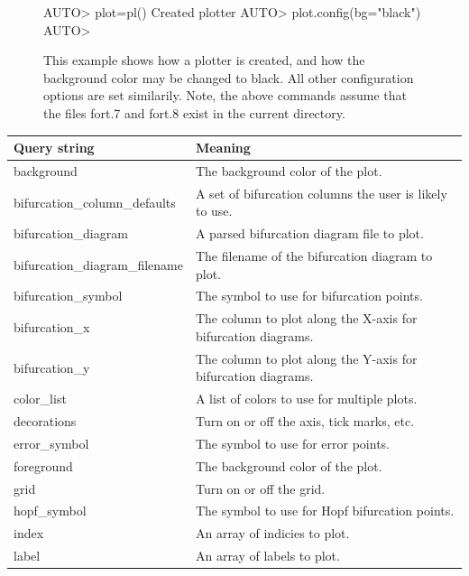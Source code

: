 \documentclass[12pt]{report}
\begin{document}
 \begin{figure}[htbp]
 {\small \begin{center} \begin{boxedverbatim} 
 AUTO> plot=pl()
 Created plotter
 AUTO> plot.config(bg="black")
 AUTO> 
 \end{boxedverbatim}
 \end{center} 
 }
 \caption[Configuring a two-dimensional plotter.]
 {This example shows how a plotter is created, and
 how the background color may be changed to black.
 All other configuration options are set similarily.
 Note, the above commands assume that the files
 fort.7 and fort.8 exist in the current directory.
 }
 \label{exa:plotter_example}
 \end{figure}

 \begin{longtable}{| l | l |}
 \hline
 Query string & Meaning \\
 \hline
 background  &  The background color of the plot. \\
 \hline
 bifurcation\_column\_defaults  & A set of bifurcation columns the user is likely to use. \\
 \hline
 bifurcation\_diagram  &  A parsed bifurcation diagram file to plot. \\
 \hline
 bifurcation\_diagram\_filename  & The filename of the bifurcation diagram to plot. \\
 \hline
 bifurcation\_symbol  &  The symbol to use for bifurcation points. \\ 
 \hline
 bifurcation\_x  & The column to plot along the X-axis for bifurcation diagrams. \\
 \hline
 bifurcation\_y  & The column to plot along the Y-axis for bifurcation diagrams. \\
 \hline
 color\_list  &  A list of colors to use for multiple plots. \\
 \hline
 decorations  & Turn on or off the axis, tick marks, etc. \\
 \hline
 error\_symbol  &    The symbol to use for error points. \\ 
 \hline
 foreground  &  The background color of the plot. \\
 \hline
 grid  &  Turn on or off the grid. \\
 \hline
 hopf\_symbol  &    The symbol to use for Hopf bifurcation points. \\ 
 \hline
 index  & An array of indicies to plot.\\
 \hline
 label  & An array of labels to plot.\\

\end{longtable}
\end{document}

